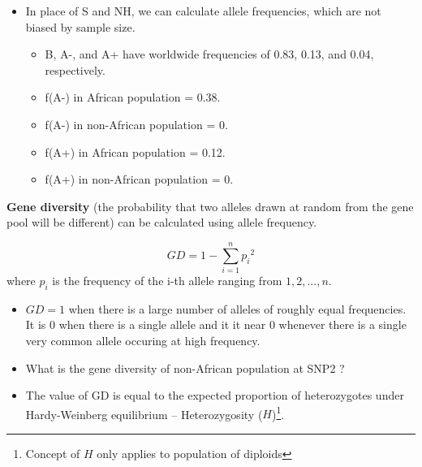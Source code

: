 \documentclass[11pt,dvipsnames,ignorenonframetext,aspectratio=169]{beamer}
\providecommand{\tightlist}{%
  \setlength{\itemsep}{0pt}\setlength{\parskip}{0pt}}
\begin{document}
\begin{frame}{}
\protect\hypertarget{section-24}{}
\footnotesize

\begin{itemize}
\tightlist
\item
  In place of S and NH, we can calculate allele frequencies, which are
  not biased by sample size.

  \begin{itemize}
  \tightlist
  \item
    B, A-, and A+ have worldwide frequencies of 0.83, 0.13, and 0.04,
    respectively.
  \item
    f(A-) in African population = 0.38.
  \item
    f(A-) in non-African population = 0.
  \item
    f(A+) in African population = 0.12.
  \item
    f(A+) in non-African population = 0.
  \end{itemize}
\end{itemize}

\textbf{Gene diversity} (the probability that two alleles drawn at
random from the gene pool will be different) can be calculated using
allele frequency.

\[
GD = 1 - \sum_{i = 1}^n{p_i}^2
\] where \(p_i\) is the frequency of the i-th allele ranging from
\(1, 2, ..., n\).

\begin{itemize}
\tightlist
\item
  \(GD = 1\) when there is a large number of alleles of roughly equal
  frequencies. It is 0 when there is a single allele and it it near 0
  whenever there is a single very common allele occuring at high
  frequency.
\end{itemize}
\end{frame}

\begin{frame}{}
\protect\hypertarget{section-25}{}
\begin{itemize}
\item
  What is the gene diversity of non-African population at SNP2 ?
\item
  The value of GD is equal to the expected proportion of heterozygotes
  under Hardy-Weinberg equilibrium -- Heterozygosity
  (\(H\))\footnote[frame]{Concept of $H$ only applies to population of diploids}.
\end{itemize}
\end{frame}
\end{document}
